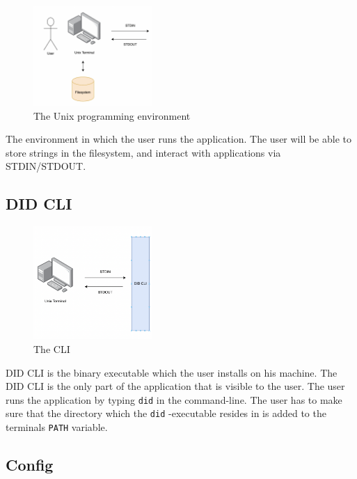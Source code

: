 \begin{figure}
\centering
\includegraphics[width=0.4\textwidth]{Architecture 1442df162dbe45f4a423ba37d3e12363/Untitled.png}
\caption{The Unix programming environment}
\end{figure}

The environment in which the user runs the application. The user will be
able to store strings in the filesystem, and interact with applications
via STDIN/STDOUT.

\hypertarget{did-cli}{%
\subsection{DID CLI}\label{did-cli}}

\begin{figure}
\centering
\includegraphics[width=0.4\textwidth]{Architecture 1442df162dbe45f4a423ba37d3e12363/Untitled 1.png}
\caption{The CLI}
\end{figure}

DID CLI is the binary executable which the user installs on his machine.
The DID CLI is the only part of the application that is visible to the
user. The user runs the application by typing
\lstinline!did! in the command-line. The user has to make
sure that the directory which the \lstinline!did!
-executable resides in is added to the terminals
\lstinline!PATH! variable.

\hypertarget{config}{%
\subsection{Config}\label{config}}

